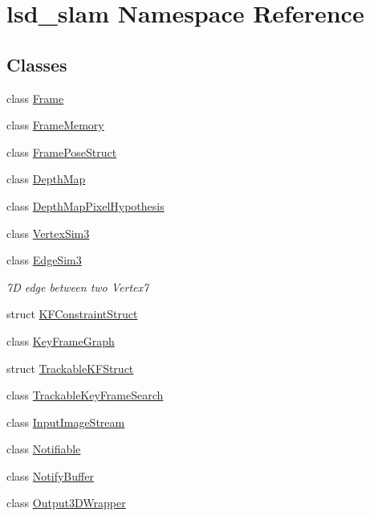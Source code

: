 \hypertarget{namespacelsd__slam}{\section{lsd\-\_\-slam Namespace Reference}
\label{namespacelsd__slam}
}
\subsection*{Classes}
\begin{DoxyCompactItemize}
\item 
class \hyperlink{classlsd__slam_1_1_frame}{Frame}
\item 
class \hyperlink{classlsd__slam_1_1_frame_memory}{Frame\-Memory}
\item 
class \hyperlink{classlsd__slam_1_1_frame_pose_struct}{Frame\-Pose\-Struct}
\item 
class \hyperlink{classlsd__slam_1_1_depth_map}{Depth\-Map}
\item 
class \hyperlink{classlsd__slam_1_1_depth_map_pixel_hypothesis}{Depth\-Map\-Pixel\-Hypothesis}
\item 
class \hyperlink{classlsd__slam_1_1_vertex_sim3}{Vertex\-Sim3}
\item 
class \hyperlink{classlsd__slam_1_1_edge_sim3}{Edge\-Sim3}
\begin{DoxyCompactList}\small\item\em 7\-D edge between two Vertex7 \end{DoxyCompactList}\item 
struct \hyperlink{structlsd__slam_1_1_k_f_constraint_struct}{K\-F\-Constraint\-Struct}
\item 
class \hyperlink{classlsd__slam_1_1_key_frame_graph}{Key\-Frame\-Graph}
\item 
struct \hyperlink{structlsd__slam_1_1_trackable_k_f_struct}{Trackable\-K\-F\-Struct}
\item 
class \hyperlink{classlsd__slam_1_1_trackable_key_frame_search}{Trackable\-Key\-Frame\-Search}
\item 
class \hyperlink{classlsd__slam_1_1_input_image_stream}{Input\-Image\-Stream}
\item 
class \hyperlink{classlsd__slam_1_1_notifiable}{Notifiable}
\item 
class \hyperlink{classlsd__slam_1_1_notify_buffer}{Notify\-Buffer}
\item 
class \hyperlink{classlsd__slam_1_1_output3_d_wrapper}{Output3\-D\-Wrapper}
\item 

\end{DoxyCompactItemize}
